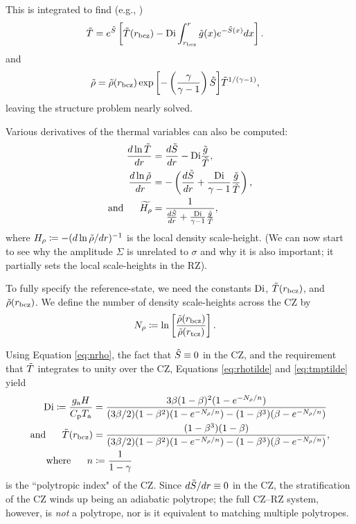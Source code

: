 \documentclass[12pt]{article}
\numberwithin{equation}{section}
\newcommand{\tmpa}{T_{\rm a}}
\newcommand{\ga}{g_{\rm a}}
\begin{document}
This is integrated to find (e.g., \citealt{Matilsky2024})
\begin{align}\label{eq:tmptilde}
	\tilde{T} &= e^{\tilde{S}}\left[\tilde{T}(r_{\rm bcz}) - {\rm{Di}}\int_{r_{\rm bcz}}^r \tilde{g}(x)  e^{-\tilde{S}(x)}dx\right].
\end{align}
and
\begin{align}\label{eq:rhotilde}
	\tilde{\rho} &= \tilde{\rho}(r_{\rm bcz}) \exp{\left[-\left(\frac{\gamma}{\gamma-1}\right)\tilde{S}\right]}\tilde{T}^{1/(\gamma-1)},
\end{align}
leaving the structure problem nearly solved. 

Various derivatives of the thermal variables can also be computed:
\begin{align}
	\frac{d\ln\tilde{T}}{dr} &= \frac{d\tilde{S}}{dr} - {\rm{Di}} \frac{\tilde{g}}{\tilde{T}},\\
	\frac{d\ln\tilde{\rho}}{dr} &= -\left(\frac{d\tilde{S}}{dr} + \frac{{\rm{Di}}}{\gamma-1}\frac{\tilde{g}}{\tilde{T}}\right),\\
	\text{and}\ \ \ \ \  \widetilde{H_\rho} &=\frac{1}{\frac{d\tilde{S}}{dr} + \frac{{\rm{Di}}}{\gamma-1}\frac{\tilde{g}}{\tilde{T}}},
\end{align}
where $H_\rho\coloneqq-(d\ln\tilde{\rho}/dr)^{-1}$ is the local density scale-height. (We can now start to see why the amplitude $\Sigma$ is unrelated to $\sigma$ and why it is also important; it partially sets the local scale-heights in the RZ). 

To fully specify the reference-state, we need the constants ${\rm{Di}}$, $\tilde{T}(r_{\rm bcz})$, and $\tilde{\rho}(r_{\rm bcz})$. We define the number of density scale-heights across the CZ by 
\begin{align}\label{eq:nrho}
	N_\rho &\coloneqq \ln\left[\frac{\tilde{\rho}(r_{\rm bcz})}{\tilde{\rho}(r_{\rm tcz})}\right].
\end{align}

Using Equation \eqref{eq:nrho}, the fact that $\tilde{S}\equiv0$ in the CZ, and the requirement that $\tilde{T}$ integrates to unity over the CZ, Equations \eqref{eq:rhotilde} and \eqref{eq:tmptilde} yield
\begin{align}\label{eq:digory}
	\di \define \frac{\ga H}{\cpcap\tmpa} &=  \frac{3 \beta (1 - \beta)^2 (1 - e^{-\nrho/n})} 
	{ (3\beta/2) (1 - \beta^2) (1 - e^{-\nrho/n}) - (1-\beta^3)(\beta-e^{-\nrho/n})}\\
	\andd \tmptilde(\rbcz)&= \frac{(1-\beta^3)(1-\beta)}{(3\beta/2)(1-\beta^2)(1-e^{-\nrho/n}) - (1-\beta^3)(\beta - e^{-\nrho/n})},\\
	\where n &\define \frac{1}{1-\gamma}
\end{align}
is the ``polytropic index" of the CZ. Since $d\tilde{S}/dr\equiv0$ in the CZ, the stratification of the CZ winds up being an adiabatic polytrope; the full CZ--RZ system, however, is \textit{not} a polytrope, nor is it equivalent to matching multiple polytropes.
\end{document}
